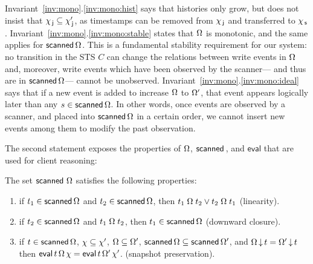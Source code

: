 Invariant~\ref{inv:mono}.\ref{inv:mono:hist} says that histories only
grow, but does not insist that $\chi_{\, \mathsf{j}} \subseteq \chi_{\, \mathsf{j}}'$, as
timestamps can be removed from $\chi_{\, \mathsf{j}}$ and transferred to $\chi_{\, \mathsf{s}}$.
%
Invariant~\ref{inv:mono}.\ref{inv:mono:stable} states that
$\Omega$ is monotonic, and the same applies for
$\mathsf{scanned}\,\Omega$. This is a fundamental stability requirement
for our system: no transition in the STS $C$ can change the relations
between write events in $\Omega$ and, moreover, write events
which have been observed by the scanner--- and thus are in
$\mathsf{scanned}\,\Omega$--- cannot be unobserved.
%
Invariant~\ref{inv:mono}.\ref{inv:mono:ideal} says that if a new event
is added to increase $\Omega$ to $\Omega'$, that event
appears logically later than any $s \in \mathsf{scanned}\,\Omega$. In
other words, once events are observed by a scanner, and placed into
$\mathsf{scanned}\,\Omega$ in a certain order, we cannot insert new
events among them to modify the past observation.

The second statement exposes the properties of $\Omega$,
$\scanned$, and $\mathsf{eval}$ that are used for client reasoning:
%
\begin{invariant}\label{lem:scanned}
The set $\mathsf{scanned}\,\, \Omega$ satisfies the following properties:
%
\begin{enumerate}
 \item\label{lem:scanned:total} if $ t_1 \in
   \mathsf{scanned}\,\Omega$ and $t_2 \in \mathsf{scanned}\,\Omega$, then
   $ t_1 \mathrel{\Omega} t_2 \vee t_2 \mathrel{\Omega}
   t_1 $ (linearity).
  
 \item \label{lem:scanned:wkn} if $ t_2 \in
   \mathsf{scanned}\,\Omega$ and $ t_1 \mathrel{\Omega} t_2$, then
   $t_1 \in \mathsf{scanned}\,\Omega$ (downward closure).

   
\item \label{lem:scanned:eval} if $t \in \mathsf{scanned}\,\Omega$,
  $\chi \subseteq \chi'$, $\Omega \subseteq \Omega'$,
  $\mathsf{scanned}\,\Omega \subseteq \mathsf{scanned}\,\Omega'$, and $
  \Omega\,{\downarrow}\,t = \Omega'\,{\downarrow}\,t$ then $ \mathsf{eval}\,
  t\, \Omega\, \chi = \mathsf{eval}\, t\, \Omega'\,
  \chi'$. (snapshot preservation).
\end{enumerate}
\end{invariant}

